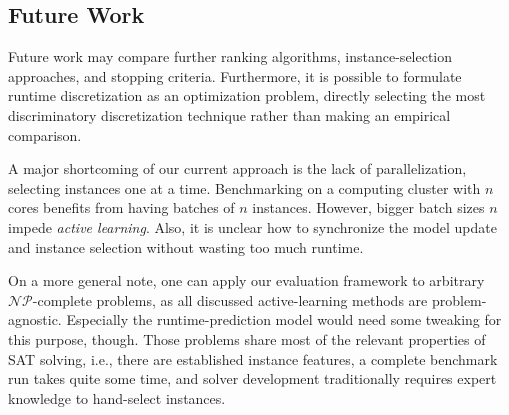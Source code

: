 \documentclass[runningheads]{llncs}
\begin{document}
\subsection{Future Work}

Future work may compare further ranking algorithms, instance-selection approaches, and stopping criteria.
Furthermore, it is possible to formulate runtime discretization as an optimization problem, directly selecting the most discriminatory discretization technique rather than making an empirical comparison.

A major shortcoming of our current approach is the lack of parallelization, selecting instances one at a time.
Benchmarking on a computing cluster with $n$ cores benefits from having batches of $n$ instances.
However, bigger batch sizes $n$ impede \emph{active learning}.
Also, it is unclear how to synchronize the model update and instance selection without wasting too much runtime.

On a more general note, one can apply our evaluation framework to arbitrary $\mathcal{NP}$-complete problems, as all discussed active-learning methods are problem-agnostic.
Especially the runtime-prediction model would need some tweaking for this purpose, though.
Those problems share most of the relevant properties of SAT solving, i.e., there are established instance features, a complete benchmark run takes quite some time, and solver development traditionally requires expert knowledge to hand-select instances.


%
%


\end{document}
